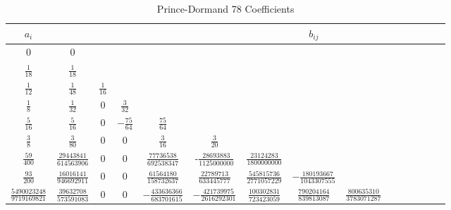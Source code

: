 

\begin{table*}
\centering
{}
\caption{Prince-Dormand 78 Coefficients }
\begin{tabular}{c|cccccccccccccc}
   $a_i$ & & & & & & & $b_{ij}$ & & & & & \\
   \hline\hline
   0  & 0 \vspace{.1in} \\
   $\frac{1}{18}$ & $\frac{1}{18}$ \vspace{.1in} \\
   $\frac{1}{12}$ &  $\frac{1}{48 }$ & $\frac{ 1 }{ 16 }$ \vspace{.1in} \\
   $\frac{1}{8}$  & $\frac{1}{ 32}$ & 0 & $\frac{3}{32}$ \vspace{.1in} \\
   $\frac{5}{ 16}$ & $\frac{5}{16}$ & 0 & $-\frac{75}{64}$ & $\frac{75 }{64 }$\vspace{.1in} \\
    $\frac{3}{8}$ & $\frac{ 3}{80}$  & 0 &  0 & $\frac{3}{16}$ & $\frac{3}{20}$ \vspace{.1in} \\
    $\frac{59}{400}$ & $\frac{29443841}{614563906}$ & 0 & 0 & $\frac{77736538}{692538347}$
    & -$\frac{28693883}{1125000000}$ &$\frac{23124283}{1800000000}$  \vspace{.1in} \\
   $\frac{93}{200}$ &     $\frac{16016141}{ 946692911}$ & 0 & 0 &  $\frac{61564180}{  158732637}$ &
    $\frac{22789713}{ 633445777}$ & $\frac{545815736}{  2771057229}$ &
    $-\frac{180193667}{1043307555}$ & \vspace{.1in} \\
    $\frac{5490023248}{9719169821}$ &     $\frac{39632708}{  573591083}$ & 0 & 0 & $-\frac{433636366}{ 683701615}$
    & $-\frac{421739975}{ 2616292301}$ & $\frac{100302831}{ 723423059}$ &
    $\frac{790204164}{ 839813087}$ & $\frac{800635310}{ 3783071287}$ & \vspace{.1in} \\

\end{tabular}
\end{table*}
